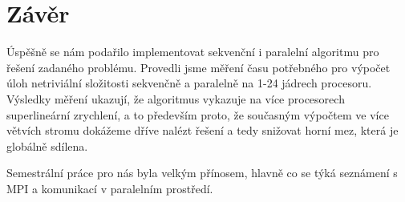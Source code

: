 \documentclass[12pt]{article}
\begin{document}
\section{Závěr}

Úspěšně se nám podařilo implementovat sekvenční i paralelní algoritmu pro řešení zadaného problému.
Provedli jsme měření času potřebného pro výpočet  úloh netriviální složitosti sekvenčně a paralelně na 1-24 jádrech procesoru.
Výsledky měření ukazují, že algoritmus vykazuje na více procesorech superlineární zrychlení, a to především proto, že současným 
výpočtem ve více větvích stromu dokážeme dříve nalézt  řešení a tedy snižovat horní mez, která je globálně sdílena.

Semestrální práce pro nás byla velkým přínosem, hlavně co se týká seznámení s MPI a komunikací v paralelním prostředí. 
\end{document}
